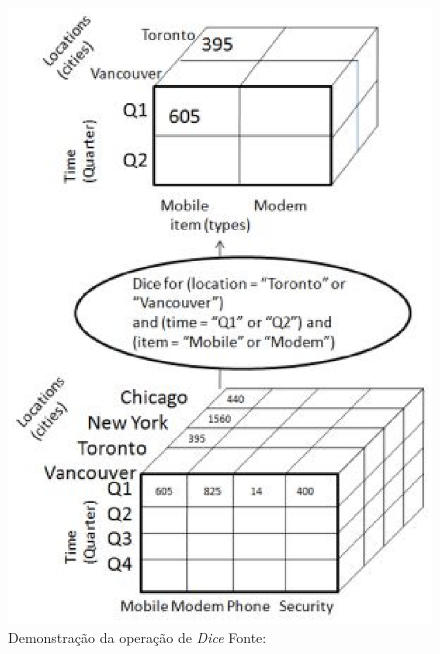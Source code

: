 \vspace{10cm}
 \begin{figure}[!htb]
 	\centering
 		\includegraphics[scale=0.7]{figuras/dw-dice}
 		\caption{Demonstração da operação de \emph{Dice}    Fonte: \cite{TutorialsPoint}}
 		\label{fig-dw-dice}
 \end{figure}
